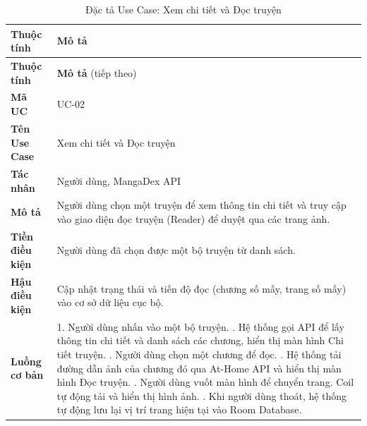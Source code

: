 \begin{longtable}{|p{3.5cm}|p{11.5cm}|}
    \caption{Đặc tả Use Case: Xem chi tiết và Đọc truyện} \label{tab:uc_read} \\
    \hline
    \textbf{Thuộc tính} & \textbf{Mô tả} \\ \hline
    \endfirsthead %

    \hline
    \textbf{Thuộc tính} & \textbf{Mô tả} (tiếp theo) \\ \hline
    \endhead %

    \textbf{Mã UC} & UC-02 \\ \hline
    \textbf{Tên Use Case} & Xem chi tiết và Đọc truyện \\ \hline
    \textbf{Tác nhân} & Người dùng, MangaDex API \\ \hline
    \textbf{Mô tả} & Người dùng chọn một truyện để xem thông tin chi tiết và truy cập vào giao diện đọc truyện (Reader) để duyệt qua các trang ảnh. \\ \hline
    \textbf{Tiền điều kiện} & Người dùng đã chọn được một bộ truyện từ danh sách. \\ \hline
    \textbf{Hậu điều kiện} & Cập nhật trạng thái và tiến độ đọc (chương số mấy, trang số mấy) vào cơ sở dữ liệu cục bộ. \\ \hline
    \textbf{Luồng cơ bản} & 
    1. Người dùng nhấn vào một bộ truyện. \newline
    2. Hệ thống gọi API để lấy thông tin chi tiết và danh sách các chương, hiển thị màn hình Chi tiết truyện. \newline
    3. Người dùng chọn một chương để đọc. \newline
    4. Hệ thống tải đường dẫn ảnh của chương đó qua At-Home API và hiển thị màn hình Đọc truyện. \newline
    5. Người dùng vuốt màn hình để chuyển trang. Coil tự động tải và hiển thị hình ảnh. \newline
    6. Khi người dùng thoát, hệ thống tự động lưu lại vị trí trang hiện tại vào Room Database. \\ \hline
\end{longtable}


